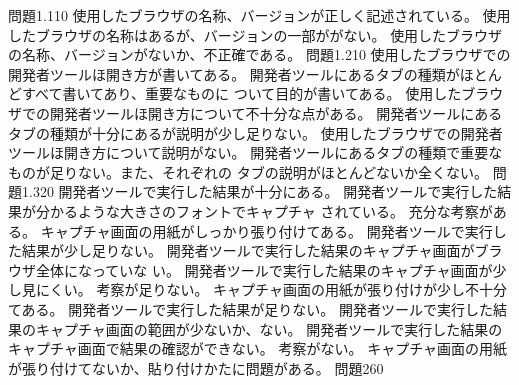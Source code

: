 
{{問題1.1}{10}{
	{使用したブラウザの名称、バージョンが正しく記述されている。}
	}
	{
	{使用したブラウザの名称はあるが、バージョンの一部ががない。}
	}
	{
	{使用したブラウザの名称、バージョンがないか、不正確である。}
	}
  {問題1.2}{10}{
	{使用したブラウザでの開発者ツールほ開き方が書いてある。}
  {開発者ツールにあるタブの種類がほとんどすべて書いてあり、重要なものに
  ついて目的が書いてある。}
  }
  {
	{使用したブラウザでの開発者ツールほ開き方について不十分な点がある。}
  {開発者ツールにあるタブの種類が十分にあるが説明が少し足りない。}
  }
  {
	{使用したブラウザでの開発者ツールほ開き方について説明がない。}
  {開発者ツールにあるタブの種類で重要なものが足りない。また、それぞれの
  タブの説明がほとんどないか全くない。}
  }
  {問題1.3}{20}{
  {開発者ツールで実行した結果が十分にある。}
  {開発者ツールで実行した結果が分かるような大きさのフォントでキャプチャ
  されている。}
  {充分な考察がある。}
  {キャプチャ画面の用紙がしっかり張り付けてある。}
  }
  {
  {開発者ツールで実行した結果が少し足りない。}
  {開発者ツールで実行した結果のキャプチャ画面がブラウザ全体になっていな
  い。}
  {開発者ツールで実行した結果のキャプチャ画面が少し見にくい。}
  {考察が足りない。}
  {キャプチャ画面の用紙が張り付けが少し不十分てある。}
  }
  {
  {開発者ツールで実行した結果が足りない。}
  {開発者ツールで実行した結果のキャプチャ画面の範囲が少ないか、ない。}
  {開発者ツールで実行した結果のキャプチャ画面で結果の確認ができない。}
  {考察がない。}
  {キャプチャ画面の用紙が張り付けてないか、貼り付けかたに問題がある。}
  }
	{問題2}{60}
	{
  }
	{
	}
	{
	}
}
